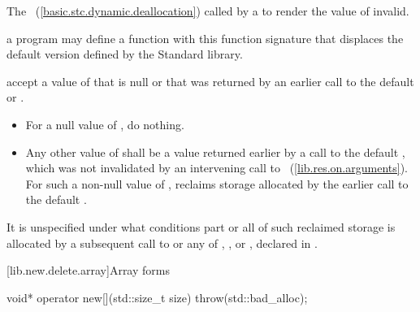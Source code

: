 \begin{itemdescr}
\pnum
\effects
The
~(\ref{basic.stc.dynamic.deallocation})
called by a 
to render the value of  invalid.

\pnum
\replaceable
a \Cpp program may define a function with this
function signature that displaces the default version defined by the
\Cpp Standard library.

\pnum
\required
accept a value of  that is null or that was returned by an earlier
call to the default
or
.

\pnum
{}

\begin{itemize}
\item For a null value of , do nothing.
\item Any other value of  shall be a value returned earlier by a
call to the default , which was not invalidated by an
intervening call to ~(\ref{lib.res.on.arguments}).
For such a non-null value of , reclaims storage allocated by the
earlier call to the default .
\end{itemize}

\pnum
\notes
It is unspecified under what conditions part or all of such
%
reclaimed storage is allocated by a subsequent
call to
or any of
,
,
or
,
declared in
.
\end{itemdescr}

[lib.new.delete.array]{Array forms}

%
\begin{itemdecl}
void* operator new[](std::size_t size) throw(std::bad_alloc);
\end{itemdecl}


